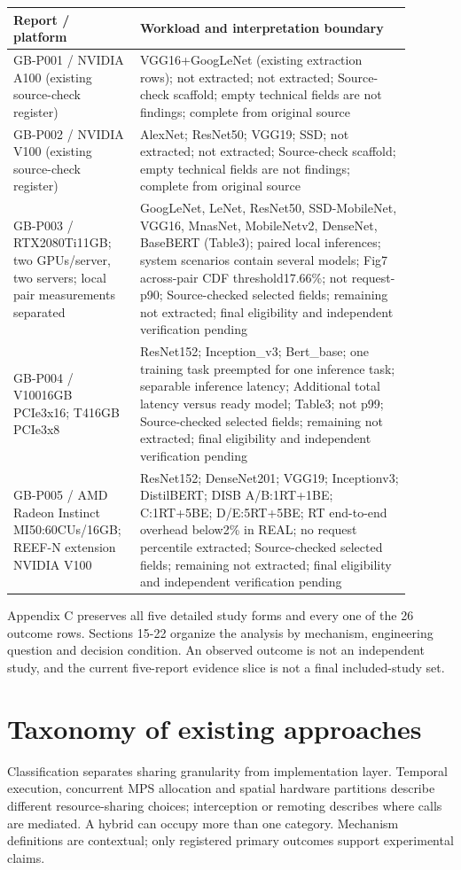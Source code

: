 \documentclass[12pt,a4paper]{article}
\begin{document}
\begin{longtable}{p{0.25\linewidth}p{0.64\linewidth}}
\toprule
Report /\allowbreak{} platform & Workload and interpretation boundary\\\midrule
\endhead
GB-P001 /\allowbreak{} NVIDIA A100 (existing source-check register) & VGG16+GoogLeNet (existing extraction rows); not extracted; not extracted; Source-check scaffold; empty technical fields are not findings; complete from original source\\
GB-P002 /\allowbreak{} NVIDIA V100 (existing source-check register) & AlexNet; ResNet50; VGG19; SSD; not extracted; not extracted; Source-check scaffold; empty technical fields are not findings; complete from original source\\
GB-P003 /\allowbreak{} RTX2080Ti11GB; two GPUs/\allowbreak{}server, two servers; local pair measurements separated & GoogLeNet, LeNet, ResNet50, SSD-MobileNet, VGG16, MnasNet, MobileNetv2, DenseNet, BaseBERT (Table3); paired local inferences; system scenarios contain several models; Fig7 across-pair CDF threshold17.66\%; not request-p90; Source-checked selected fields; remaining not extracted; final eligibility and independent verification pending\\
GB-P004 /\allowbreak{} V10016GB PCIe3x16; T416GB PCIe3x8 & ResNet152; Inception\_v3; Bert\_base; one training task preempted for one inference task; separable inference latency; Additional total latency versus ready model; Table3; not p99; Source-checked selected fields; remaining not extracted; final eligibility and independent verification pending\\
GB-P005 /\allowbreak{} AMD Radeon Instinct MI50:60CUs/\allowbreak{}16GB; REEF-N extension NVIDIA V100 & ResNet152; DenseNet201; VGG19; Inceptionv3; DistilBERT; DISB A/\allowbreak{}B:1RT+1BE; C:1RT+5BE; D/\allowbreak{}E:5RT+5BE; RT end-to-end overhead below2\% in REAL; no request percentile extracted; Source-checked selected fields; remaining not extracted; final eligibility and independent verification pending\\
\bottomrule
\end{longtable}

Appendix C preserves all five detailed study forms and every one of the 26 outcome rows. Sections 15-22 organize the analysis by mechanism, engineering question and decision condition. An observed outcome is not an independent study, and the current five-report evidence slice is not a final included-study set.


\section{Taxonomy of existing approaches}
Classification separates sharing granularity from implementation layer. Temporal execution, concurrent MPS allocation and spatial hardware partitions describe different resource-sharing choices; interception or remoting describes where calls are mediated. A hybrid can occupy more than one category. Mechanism definitions are contextual; only registered primary outcomes support experimental claims.
\end{document}
